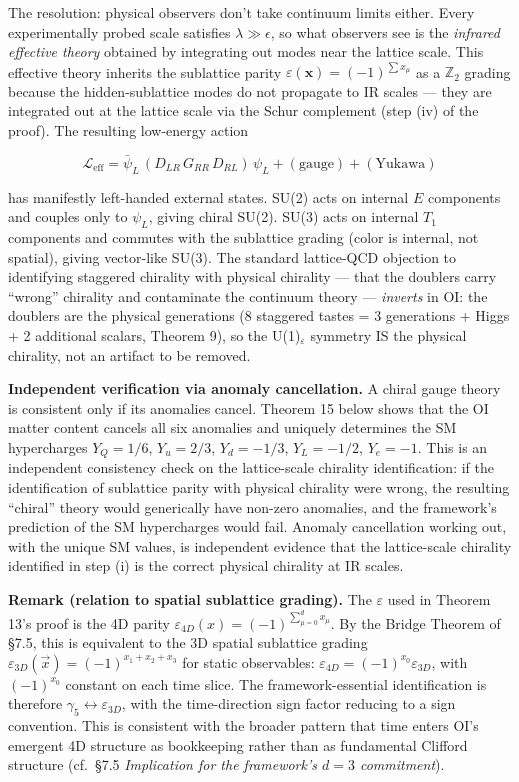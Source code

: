 \documentclass[
]{article}
\begin{document}
The resolution: physical observers don't take continuum limits either.
Every experimentally probed scale satisfies \(\lambda \gg \epsilon\), so
what observers see is the \emph{infrared effective theory} obtained by
integrating out modes near the lattice scale. This effective theory
inherits the sublattice parity
\(\varepsilon(\mathbf{x}) = (-1)^{\sum x_\mu}\) as a \(\mathbb{Z}_2\)
grading because the hidden-sublattice modes do not propagate to IR
scales --- they are integrated out at the lattice scale via the Schur
complement (step (iv) of the proof). The resulting low-energy action

\[\mathcal{L}_{\text{eff}} = \bar\psi_L \, (D_{LR} \, G_{RR} \, D_{RL}) \, \psi_L + (\text{gauge}) + (\text{Yukawa})\]

has manifestly left-handed external states. SU(2) acts on internal \(E\)
components and couples only to \(\psi_L\), giving chiral SU(2). SU(3)
acts on internal \(T_1\) components and commutes with the sublattice
grading (color is internal, not spatial), giving vector-like SU(3). The
standard lattice-QCD objection to identifying staggered chirality with
physical chirality --- that the doublers carry ``wrong'' chirality and
contaminate the continuum theory --- \emph{inverts} in OI: the doublers
are the physical generations (8 staggered tastes = 3 generations + Higgs
+ 2 additional scalars, Theorem 9), so the U(1)\(_\varepsilon\) symmetry
IS the physical chirality, not an artifact to be removed.

\textbf{Independent verification via anomaly cancellation.} A chiral
gauge theory is consistent only if its anomalies cancel. Theorem 15
below shows that the OI matter content cancels all six anomalies and
uniquely determines the SM hypercharges \(Y_Q = 1/6\), \(Y_u = 2/3\),
\(Y_d = -1/3\), \(Y_L = -1/2\), \(Y_e = -1\). This is an independent
consistency check on the lattice-scale chirality identification: if the
identification of sublattice parity with physical chirality were wrong,
the resulting ``chiral'' theory would generically have non-zero
anomalies, and the framework's prediction of the SM hypercharges would
fail. Anomaly cancellation working out, with the unique SM values, is
independent evidence that the lattice-scale chirality identified in step
(i) is the correct physical chirality at IR scales.

\textbf{Remark (relation to spatial sublattice grading).} The
\(\varepsilon\) used in Theorem 13's proof is the 4D parity
\(\varepsilon_{4D}(x) = (-1)^{\sum_{\mu = 0}^{d}x_\mu}\). By the Bridge
Theorem of §7.5, this is equivalent to the 3D spatial sublattice grading
\(\varepsilon_{3D}(\vec x) = (-1)^{x_1 + x_2 + x_3}\) for static
observables: \(\varepsilon_{4D} = (-1)^{x_0} \varepsilon_{3D}\), with
\((-1)^{x_0}\) constant on each time slice. The framework-essential
identification is therefore
\(\gamma_5 \leftrightarrow \varepsilon_{3D}\), with the time-direction
sign factor reducing to a sign convention. This is consistent with the
broader pattern that time enters OI's emergent 4D structure as
bookkeeping rather than as fundamental Clifford structure (cf.~§7.5
\emph{Implication for the framework's \(d = 3\) commitment}).
\end{document}
